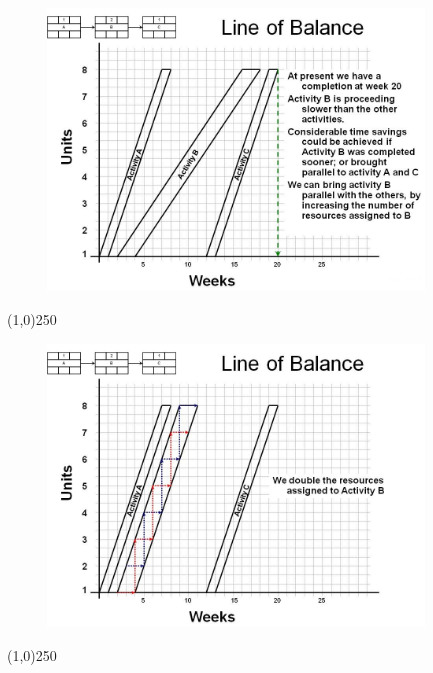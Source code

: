 \begin{frame}
\begin{figure}
	\centering
		\includegraphics[width = 10.0cm]{oldnotes/Slide251.jpg}
\end{figure}
\end{frame}
\begin{center}\line(1,0){250}\end{center}






\begin{frame}
\begin{figure}
	\centering
		\includegraphics[width = 10.0cm]{oldnotes/Slide252.jpg}
\end{figure}
\end{frame}
\begin{center}\line(1,0){250}\end{center}






